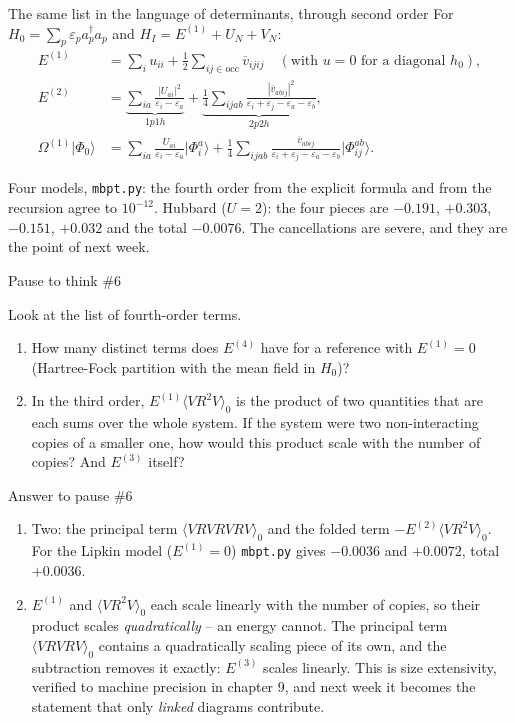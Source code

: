 \documentclass[aspectratio=169,10pt]{beamer}
\newcounter{thinkctr}
\newcommand{\thinkq}[2]{%
  \stepcounter{thinkctr}%
  \vfill
  \begin{tcolorbox}[enhanced,colback=palewarm,colframe=warm,boxrule=1.2pt,arc=4pt,
    grow to left by=6mm,grow to right by=6mm,
    left=16pt,right=16pt,top=16pt,bottom=18pt,
    fonttitle=\bfseries\Large,fontupper=\Large,
    title={Pause to think \#\thethinkctr\hfill\mdseries\normalsize(about #1 min -- discuss with your neighbour)}]
  #2
  \end{tcolorbox}
  \vfill}
\newcommand{\thinka}[1]{%
  \vfill
  \begin{tcolorbox}[enhanced,colback=paleteal,colframe=teal,boxrule=1.2pt,arc=4pt,
    grow to left by=6mm,grow to right by=6mm,
    left=16pt,right=16pt,top=16pt,bottom=18pt,
    fonttitle=\bfseries\Large,fontupper=\large,
    title={Answer to pause \#\thethinkctr}]
  #1
  \end{tcolorbox}
  \vfill}
\newcommand{\numbox}[1]{%
  \begin{tcolorbox}[colback=palegreen,colframe=teal!70!black,title={\bfseries Measured}]
  #1
  \end{tcolorbox}}
\newcommand{\ket}[1]{\vert #1\rangle}
\newcommand{\av}[1]{\langle #1\rangle_0}
\newcommand{\cre}[1]{a_{#1}^{\dagger}}
\newcommand{\ann}[1]{a_{#1}}
\newcommand{\vbar}[4]{\overline v_{#1#2#3#4}}
\newcommand{\ph}{\Phi_0}
\begin{document}
\begin{frame}{The same list in the language of determinants, through second order}
For \(H_0=\sum_p\varepsilon_p\cre{p}\ann{p}\) and \(H_I=E^{(1)}+U_N+V_N\):
\begin{align*}
E^{(1)}&=\sum_{i}u_{ii}+\frac12\sum_{ij\in\mathrm{occ}}\vbar{i}{j}{i}{j}
\quad(\text{with } u=0 \text{ for a diagonal } h_0),\\[2pt]
E^{(2)}&=\underbrace{\sum_{ia}\frac{|U_{ai}|^2}{\varepsilon_i-\varepsilon_a}}_{1p1h}
+\underbrace{\frac14\sum_{ijab}\frac{|\vbar{a}{b}{i}{j}|^2}{\varepsilon_i+\varepsilon_j-\varepsilon_a-\varepsilon_b}}_{2p2h},\\[2pt]
\Omega^{(1)}\ket{\ph}&=\sum_{ia}\frac{U_{ai}}{\varepsilon_i-\varepsilon_a}\ket{\Phi_i^a}
+\frac14\sum_{ijab}\frac{\vbar{a}{b}{i}{j}}{\varepsilon_i+\varepsilon_j-\varepsilon_a-\varepsilon_b}\ket{\Phi_{ij}^{ab}}.
\end{align*}
\numbox{Four models, \texttt{mbpt.py}: the fourth order from the explicit formula and from the recursion agree to \(10^{-12}\). Hubbard (\(U=2\)): the four pieces are \(-0.191\), \(+0.303\), \(-0.151\), \(+0.032\) and the total \(-0.0076\). The cancellations are severe, and they are the point of next week.}
\end{frame}

\begin{frame}{Pause to think \#6}
\thinkq{3}{Look at the list of fourth-order terms.
\begin{enumerate}
\item How many distinct terms does \(E^{(4)}\) have for a reference with \(E^{(1)}=0\) (Hartree-Fock partition with the mean field in \(H_0\))?
\item In the third order, \(E^{(1)}\av{VR^2V}\) is the product of two quantities that are each sums over the whole system. If the system were two non-interacting copies of a smaller one, how would this product scale with the number of copies? And \(E^{(3)}\) itself?
\end{enumerate}}
\end{frame}

\begin{frame}{Answer to pause \#6}
\thinka{%
\begin{enumerate}
\item Two: the principal term \(\av{VRVRVRV}\) and the folded term \(-E^{(2)}\av{VR^2V}\). For the Lipkin model (\(E^{(1)}=0\)) \texttt{mbpt.py} gives \(-0.0036\) and \(+0.0072\), total \(+0.0036\).
\item \(E^{(1)}\) and \(\av{VR^2V}\) each scale linearly with the number of copies, so their product scales \emph{quadratically} -- an energy cannot. The principal term \(\av{VRVRV}\) contains a quadratically scaling piece of its own, and the subtraction removes it exactly: \(E^{(3)}\) scales linearly. This is size extensivity, verified to machine precision in chapter 9, and next week it becomes the statement that only \emph{linked} diagrams contribute.
\end{enumerate}}
\end{frame}
\end{document}
